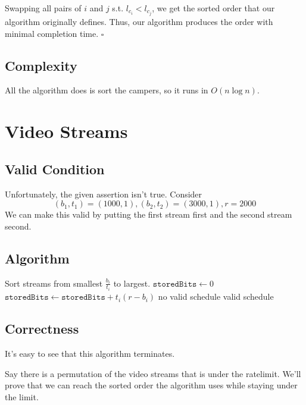 \documentclass[12pt]{article}
\begin{document}
Swapping all pairs of $i$ and $j$ s.t. $l_{c_i} < l_{c_j}$, we get the
sorted order that our algorithm originally defines.
Thus, our algorithm produces the order with minimal completion time. $\square$

\subsection{Complexity}

All the algorithm does is sort the campers, so it runs in $\boxed{O(n \log n)}$.

\pagebreak

\section{Video Streams}

\subsection{Valid Condition}

Unfortunately, the given assertion isn't true.
Consider
\[(b_1, t_1) = (1000, 1), (b_2, t_2)=(3000, 1), r=2000\]
We can make this valid by putting the first stream first and the second stream second.

\subsection{Algorithm}

\begin{algorithmic}[1]
    \State Sort streams from smallest $\frac{b_i}{t_i}$ to largest.
    \State $\texttt{storedBits} \gets 0$
        \State $\texttt{storedBits} \gets \texttt{storedBits} + t_i (r - b_i)$
            \State \Return no valid schedule
        \EndIf
    \EndFor
    \State \Return valid schedule
\end{algorithmic}

\subsection{Correctness}

It's easy to see that this algorithm terminates.

Say there is a permutation of the video streams that is under the ratelimit.
We'll prove that we can reach the sorted order the algorithm uses while staying under the limit.
\end{document}

